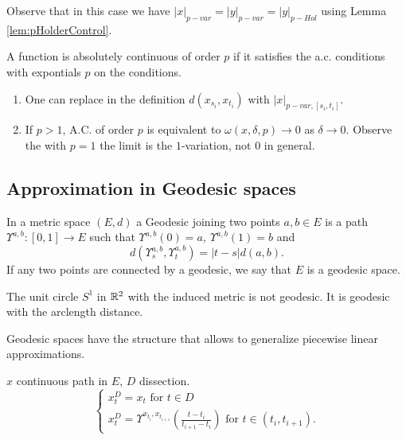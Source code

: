 Observe that in this case we have $|x|_{p-var} = |y|_{p-var} = |y|_{p-Hol}$ using Lemma \ref{lem:pHolderControl}.

\begin{exercise}
    A function is absolutely continuous of order $p$ if it satisfies the a.c. conditions with expontials $p$ on the conditions.
    \begin{enumerate}
        \item One can replace in the definition $d(x_{s_i}, x_{t_i})$ with $|x|_{p-var,[s_i,t_i]}$.
        \item If $p > 1$, A.C. of order $p$ is equivalent to $\omega(x,\delta,p) \rightarrow 0$ as $\delta \rightarrow 0.$ Observe the with $p=1$ the limit is the $1$-variation, not $0$ in general.
    \end{enumerate}
\end{exercise}

\subsection{Approximation in Geodesic spaces}

\begin{definition}
    In a metric space $(E,d)$ a Geodesic joining two points $a,b \in E$ is a path $\Upsilon^{a,b}:[0,1] \rightarrow E$ such that $\Upsilon^{a,b}(0) = a,\ \Upsilon^{a,b}(1) = b$ and 
    \begin{equation}
        d \left( \Upsilon^{a,b}_s, \Upsilon^{a,b}_t \right) = |t - s| d(a,b).
    \end{equation} 
    If any two points are connected by a geodesic, we say that $E$ is a geodesic space.
\end{definition}

\begin{example}
    The unit circle $S^1$ in $\mathbb{R}^2$ with the induced metric is not geodesic. It is geodesic with the arclength distance.
\end{example}

Geodesic spaces have the structure that allows to generalize piecewise linear approximations.

\begin{definition}[PL approximations]
    $x$ continuous path in $E$, $D$ dissection.
    \begin{equation}
        \begin{cases}
            x^D_t = x_t \text{ for } t \in D \\
            x^D_t = \Upsilon^{x_{t_i}, x_{t_{i+1}}} \left( \frac{t - t_i}{t_{i+1} - t_i} \right) \text{ for } t \in (t_i, t_{i+1}). 
        \end{cases}
    \end{equation}
\end{definition}

